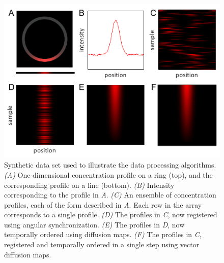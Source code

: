 \begin{figure}
\includegraphics{figS2}
\caption[Synthetic data set used to illustrate registration and ordering algorithms]{Synthetic data set used to illustrate the data processing algorithms. {\it (A)} One-dimensional concentration profile on a ring (top), and the corresponding profile on a line (bottom). {\it (B)} Intensity corresponding to the profile in {\it A}. {\it (C)} An ensemble of concentration profiles, each of the form described in {\it A}. Each row in the array corresponds to a single profile. {\it (D)} The profiles in {\it C}, now registered using angular synchronization. {\it (E)} The profiles in {\it D}, now temporally ordered using diffusion maps. {\it (F)} The profiles in {\it C}, registered and temporally ordered in a single step using vector diffusion maps.}
\label{fig:1d_demo}
\end{figure}

